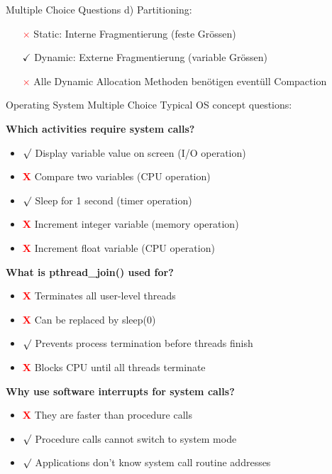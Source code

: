 \begin{example2}{Multiple Choice Questions}
    d) Partitioning:
    \begin{itemize}
        \item[\textcolor{red}{$\times$}] Static: Interne Fragmentierung (feste Grössen)
        \item[\textcolor{frog}{$\checkmark$}] Dynamic: Externe Fragmentierung (variable Grössen)
        \item[\textcolor{red}{$\times$}] Alle Dynamic Allocation Methoden benötigen eventüll Compaction
    \end{itemize}
\end{example2}

\begin{example2}{Operating System Multiple Choice}
    Typical OS concept questions:
    
    \textbf{Which activities require system calls?}
    \begin{itemize}
        \item \textcolor{frog}{$\surd$} Display variable value on screen (I/O operation)
        \item \textcolor{red}{\textbf{X}} Compare two variables (CPU operation)
        \item \textcolor{frog}{$\surd$} Sleep for 1 second (timer operation)
        \item \textcolor{red}{\textbf{X}} Increment integer variable (memory operation)
        \item \textcolor{red}{\textbf{X}} Increment float variable (CPU operation)
    \end{itemize}
    
    \textbf{What is pthread\_join() used for?}
    \begin{itemize}
        \item \textcolor{red}{\textbf{X}} Terminates all user-level threads
        \item \textcolor{red}{\textbf{X}} Can be replaced by sleep(0)
        \item \textcolor{frog}{$\surd$} Prevents process termination before threads finish
        \item \textcolor{red}{\textbf{X}} Blocks CPU until all threads terminate
    \end{itemize}
    
    \textbf{Why use software interrupts for system calls?}
    \begin{itemize}
        \item \textcolor{red}{\textbf{X}} They are faster than procedure calls
        \item \textcolor{frog}{$\surd$} Procedure calls cannot switch to system mode
        \item \textcolor{frog}{$\surd$} Applications don't know system call routine addresses
    \end{itemize}
\end{example2}

